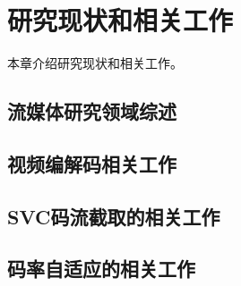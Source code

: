 \chapter{研究现状和相关工作}
本章介绍研究现状和相关工作。

\section{流媒体研究领域综述}

\section{视频编解码相关工作}

\section{SVC码流截取的相关工作}

\section{码率自适应的相关工作}